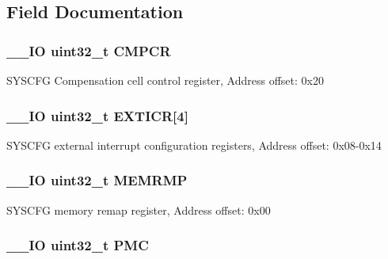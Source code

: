 \subsection{Field Documentation}
\hypertarget{struct_s_y_s_c_f_g___type_def_a08ddbac546fa9928256654d31255c8c3}{
\subsubsection[{C\-M\-P\-C\-R}]{\setlength{\rightskip}{0pt plus 5cm}\-\_\-\-\_\-\-I\-O uint32\-\_\-t C\-M\-P\-C\-R}}\label{struct_s_y_s_c_f_g___type_def_a08ddbac546fa9928256654d31255c8c3}
S\-Y\-S\-C\-F\-G Compensation cell control register, Address offset\-: 0x20 \hypertarget{struct_s_y_s_c_f_g___type_def_a52f7bf8003ba69d66a4e86dea6eeab65}{
\subsubsection[{E\-X\-T\-I\-C\-R}]{\setlength{\rightskip}{0pt plus 5cm}\-\_\-\-\_\-\-I\-O uint32\-\_\-t E\-X\-T\-I\-C\-R\mbox{[}4\mbox{]}}}\label{struct_s_y_s_c_f_g___type_def_a52f7bf8003ba69d66a4e86dea6eeab65}
S\-Y\-S\-C\-F\-G external interrupt configuration registers, Address offset\-: 0x08-\/0x14 \hypertarget{struct_s_y_s_c_f_g___type_def_ab36c409d0a009e3ce5a89ac55d3ff194}{
\subsubsection[{M\-E\-M\-R\-M\-P}]{\setlength{\rightskip}{0pt plus 5cm}\-\_\-\-\_\-\-I\-O uint32\-\_\-t M\-E\-M\-R\-M\-P}}\label{struct_s_y_s_c_f_g___type_def_ab36c409d0a009e3ce5a89ac55d3ff194}
S\-Y\-S\-C\-F\-G memory remap register, Address offset\-: 0x00 \hypertarget{struct_s_y_s_c_f_g___type_def_a2130abf1fefb63ce4c4b138fd8c9822a}{
\subsubsection[{P\-M\-C}]{\setlength{\rightskip}{0pt plus 5cm}\-\_\-\-\_\-\-I\-O uint32\-\_\-t P\-M\-C}}\label{struct_s_y_s_c_f_g___type_def_a2130abf1fefb63ce4c4b138fd8c9822a}
